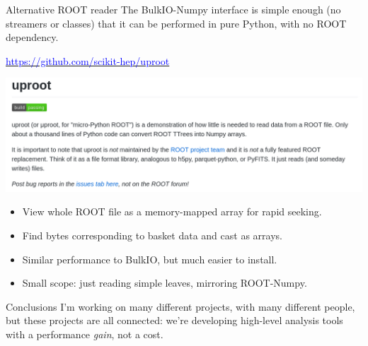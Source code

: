 \documentclass{beamer}
\begin{document}
\begin{frame}{Alternative ROOT reader}
\vspace{0.5 cm}
The BulkIO-Numpy interface is simple enough (no streamers or classes) that it can be performed in pure Python, with no ROOT dependency.

\begin{center}
\href{https://github.com/scikit-hep/uproot}{\textcolor{blue}{https://github.com/scikit-hep/uproot}}

\includegraphics[width=0.9\linewidth]{uproot.png}
\end{center}

\begin{minipage}{\linewidth}
\small
\begin{itemize}
\item View whole ROOT file as a memory-mapped array for rapid seeking.
\item Find bytes corresponding to basket data and cast as arrays.
\item Similar performance to BulkIO, but much easier to install.
\item Small scope: just reading simple leaves, mirroring ROOT-Numpy.
\end{itemize}
\end{minipage}
\end{frame}

\begin{frame}{Conclusions}
\vspace{0.5 cm}
I'm working on many different projects, with many different people, but these projects are all connected: we're developing high-level analysis tools with a performance {\it gain}, not a cost.

\vspace{0.5 cm}

\vspace{0.5 cm}
\end{frame}
\end{document}
